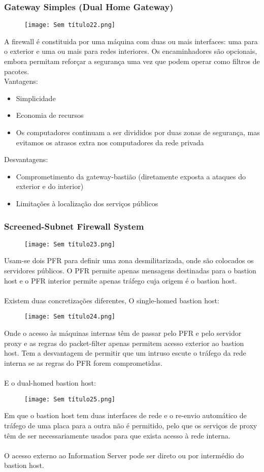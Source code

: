\documentclass[10pt,a4paper]{report}
\begin{document}
\subsubsection{Gateway Simples (Dual Home Gateway)}
\begin{figure}[H]
\centering
\texttt{[image: Sem título22.png]}
\end{figure}
A firewall é constituida por uma máquina com duas ou mais interfaces: uma para o exterior e uma ou mais para redes interiores. Os encaminhadores são opcionais, embora permitam reforçar a segurança uma vez que
podem operar como filtros de pacotes.\\
Vantagens:
\begin{itemize}
\item Simplicidade
\item Economia de recursos
\item Os computadores continuam a ser divididos por duas zonas de segurança,
mas evitamos os atrasos extra nos computadores da rede privada
\end{itemize}
Desvantagens:
\begin{itemize}
\item Comprometimento da gateway-bastião (diretamente exposta a ataques do exterior e do interior)
\item Limitações à localização dos serviços públicos
\end{itemize}
\subsubsection{Screened-Subnet Firewall System}
\begin{figure}[H]
\centering
\texttt{[image: Sem título23.png]}
\end{figure}
Usam-se dois PFR para definir uma zona desmilitarizada, onde são colocados os servidores públicos. O PFR permite apenas mensagens destinadas para o bastion host e o PFR interior permite apenas tráfego cuja origem é o bastion host.\\
\\
Existem duas concretizações diferentes, O single-homed bastion host:
\begin{figure}[H]
\centering
\texttt{[image: Sem título24.png]}
\end{figure}
Onde o acesso às máquinas internas têm de passar pelo PFR e pelo servidor proxy e as regras do packet-filter apenas permitem acesso exterior ao bastion host. Tem a desvantagem de permitir que um intruso escute o tráfego da rede interna se as regras do PFR forem comprometidas.\\
\\
E o dual-homed bastion host:
\begin{figure}[H]
\centering
\texttt{[image: Sem título25.png]}
\end{figure}
Em que o bastion host tem duas interfaces de rede e o re-envio automático de tráfego de uma placa para a outra não é permitido, pelo que os serviços de proxy têm de ser necessariamente usados para que exista acesso à rede interna.\\
\\
O acesso externo ao Information Server pode ser direto ou por intermédio do bastion host.
\end{document}
